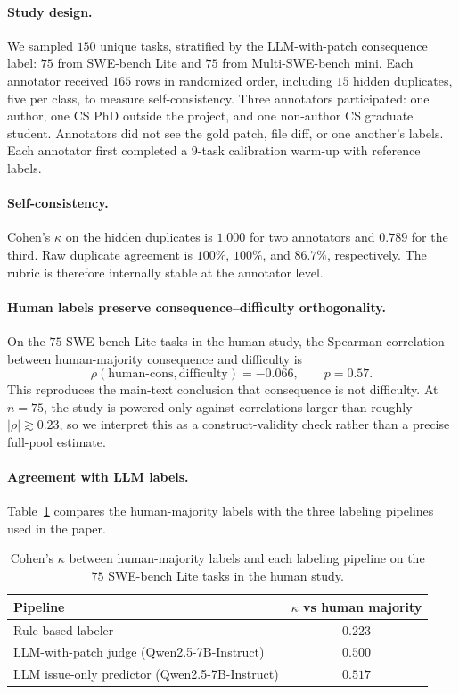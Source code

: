 \documentclass{article}
\begin{document}
\paragraph{Study design.}
We sampled $150$ unique tasks, stratified by the LLM-with-patch
consequence label: $75$ from SWE-bench Lite and $75$ from
Multi-SWE-bench mini. Each annotator received $165$ rows in randomized
order, including $15$ hidden duplicates, five per class, to measure
self-consistency. Three annotators participated: one author, one CS PhD
outside the project, and one non-author CS graduate student. Annotators
did not see the gold patch, file diff, or one another's labels. Each
annotator first completed a $9$-task calibration warm-up with reference
labels.

\paragraph{Self-consistency.}
Cohen's $\kappa$ on the hidden duplicates is $1.000$ for two
annotators and $0.789$ for the third. Raw duplicate agreement is
$100\%$, $100\%$, and $86.7\%$, respectively. The rubric is therefore
internally stable at the annotator level.

\paragraph{Human labels preserve consequence--difficulty orthogonality.}
On the $75$ SWE-bench Lite tasks in the human study, the Spearman
correlation between human-majority consequence and difficulty is
\[
\rho(\mathrm{human\mbox{-}cons},\mathrm{difficulty})=-0.066,
\qquad p=0.57.
\]
This reproduces the main-text conclusion that consequence is not
difficulty. At $n=75$, the study is powered only against correlations
larger than roughly $|\rho|\gtrsim 0.23$, so we interpret this as a
construct-validity check rather than a precise full-pool estimate.

\paragraph{Agreement with LLM labels.}
Table~\ref{tab:human-vs-llm} compares the human-majority labels with
the three labeling pipelines used in the paper.

\begin{table}[h]
\centering
\caption{Cohen's $\kappa$ between human-majority labels and each
labeling pipeline on the $75$ SWE-bench Lite tasks in the human study.}
\label{tab:human-vs-llm}
\small
\begin{tabular}{lc}
\toprule
Pipeline & $\kappa$ vs human majority \\
\midrule
Rule-based labeler & $0.223$ \\
LLM-with-patch judge (Qwen2.5-7B-Instruct) & $0.500$ \\
LLM issue-only predictor (Qwen2.5-7B-Instruct) & $0.517$ \\
\bottomrule
\end{tabular}
\end{table}
\end{document}
